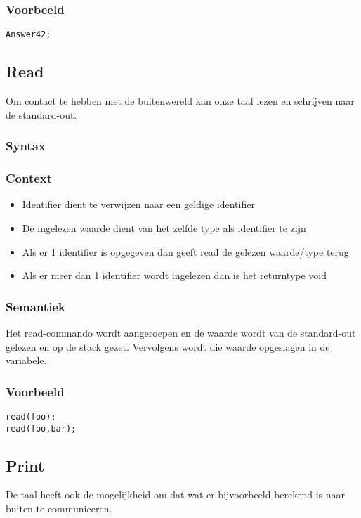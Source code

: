 \documentclass[]{article}
\begin{document}
\subsubsection{Voorbeeld}
\begin{lstlisting}[style=SELMA]
Answer42;
\end{lstlisting}

\subsection{Read}
Om contact te hebben met de buitenwereld kan onze taal lezen en schrijven naar de standard-out. 
\subsubsection{Syntax}

\subsubsection{Context}
\begin{itemize}
\item Identifier dient te verwijzen naar een geldige identifier
\item De ingelezen waarde dient van het zelfde type als identifier te zijn
\item Als er 1 identifier is opgegeven dan geeft read de gelezen waarde/type terug
\item Als er meer dan 1 identifier wordt ingelezen dan is het returntype void
\end{itemize}
\subsubsection{Semantiek}
Het read-commando wordt aangeroepen en de waarde wordt van de standard-out gelezen en op de stack gezet. Vervolgens wordt die waarde opgeslagen in de variabele.
\subsubsection{Voorbeeld}
\begin{lstlisting}[style=SELMA]
read(foo);
read(foo,bar);
\end{lstlisting}

\subsection{Print}
De taal heeft ook de mogelijkheid om dat wat er bijvoorbeeld berekend is naar buiten te communiceren.
\end{document}

